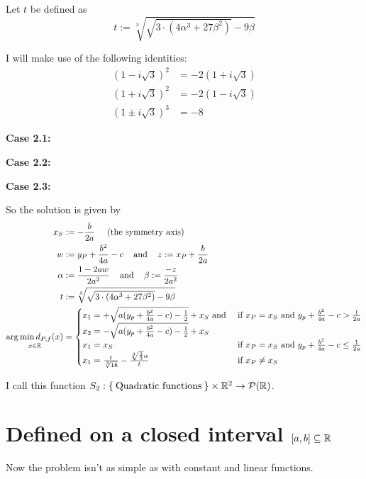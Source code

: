 Let $t$ be defined as
\[t := \sqrt[3]{\sqrt{3 \cdot (4 \alpha^3 + 27 \beta^2)} -9\beta}\]

I will make use of the following identities:
\begin{align*}
    (1-i \sqrt{3})^2     &= -2 (1+i \sqrt{3})\\
    (1+i \sqrt{3})^2     &= -2 (1-i \sqrt{3})\\
    (1 \pm i \sqrt{3})^3 &= -8
\end{align*}

\textbf{Case 2.1:} 

\goodbreak
\textbf{Case 2.2:}


\textbf{Case 2.3:}


\goodbreak
So the solution is given by
\begin{align*}
x_S &:= - \frac{b}{2a} \;\;\;\;\; \text{(the symmetry axis)}\\
w &:= y_P+\frac{b^2}{4a}-c \;\;\; \text{ and } \;\;\; z := x_P+\frac{b}{2a}\\
\alpha &:= \frac{1- 2 aw}{2 a^2} \;\;\;\text{ and }\;\;\; \beta := \frac{-z}{2 a^2}\\
t &:= \sqrt[3]{\sqrt{3 \cdot (4 \alpha^3 + 27 \beta^2)} -9\beta}\\
\underset{x\in\mathbb{R}}{\arg \min d_{P,f}(x)} &= \begin{cases}
     x_1 = +\sqrt{a (y_p + \frac{b^2}{4a} - c) - \frac{1}{2}} + x_S \text{ and }   &\text{if } x_P = x_S \text{ and } y_p + \frac{b^2}{4a} - c >  \frac{1}{2a} \\
     x_2 = -\sqrt{a (y_p + \frac{b^2}{4a} - c) - \frac{1}{2}} + x_S\\
     x_1 = x_S   &\text{if } x_P = x_S \text{ and } y_p + \frac{b^2}{4a} - c \leq  \frac{1}{2a} \\
     x_1 = \frac{t}{\sqrt[3]{18}} - \frac{\sqrt[3]{\frac{2}{3}} \alpha }{t}   &\text{if } x_P \neq x_S
    \end{cases}
\end{align*}

I call this function $S_2: \Set{\text{Quadratic functions}} \times \mathbb{R}^2 \rightarrow \mathcal{P}({\mathbb{R}})$.  
\clearpage

\section{Defined on a closed interval $[a,b] \subseteq \mathbb{R}$}
Now the problem isn't as simple as with constant and linear
functions.

